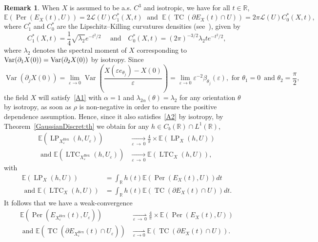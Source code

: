 \documentclass[10pt]{amsart}
\theoremstyle{definition}\newtheorem{defi}[theo]{Definition}\newtheorem{rema}[theo]{Remark}\newtheorem{exam}[theo]{Example}\newtheorem{exem}[theo]{Example}\newtheorem{nota}[theo]{Notation}
\newcommand{\R}{\mathbb{R}}
\newcommand{\E}{\mathbb{E}}
\newcommand{\eps}{\varepsilon}
\DeclareMathOperator{\TC}{TC}
\DeclareMathOperator{\LTC}{LTC}
\DeclareMathOperator{\LP}{LP}
\DeclareMathOperator{\Per}{Per}
\DeclareMathOperator{\Hex}{Hex}
\DeclareMathOperator{\Var}{Var}
\newcommand{\calL}{\mathcal{L}}
\begin{document}
\begin{rema}
When $X$ is assumed to be a.s. $C^3$ and isotropic, we have for all $t\in\R$,
\[
\E\left(\Per(E_X(t),U)\right) =2{\calL}(U)C_1^\ast(X,t)\;\text{ and }\;
\E\left(\TC(\partial E_X(t)\cap U)\right)= 2\pi {\calL}(U) C_0^\ast(X,t),
\]
where $C_1^\ast$ and $C_0^\ast$ are the Lipschitz--Killing curvatures densities (see~\cite{BDDE-19}), given by
\[
C_1^\ast(X,t)=\frac{1}{4}\sqrt{\lambda_2}e^{-t^2/2} \quad \text{ and
} \quad C_0^\ast(X,t)=(2\pi)^{-3/2}{\lambda_2}te^{-t^2/2},
\]
where $\lambda_2$ denotes the spectral moment of $X$ corresponding to $\Var(\partial_1 X(0))\linebreak=\Var(\partial_2 X(0))$ by isotropy. Since
\[
\Var\left(\partial_j X(0)\right)=\lim_{\eps\rightarrow 0}\Var\left(\frac{X(\eps e_{\theta_j})-X(0)}{\eps}\right)=\lim_{\eps\rightarrow 0}\eps^{-2}\beta_{\theta_j}(\eps),\text{ for }\theta_1=0
\,
\text{ and }\theta_2=\frac{\pi}{2},
\]
the field $X$ will satisfy~\eqref{A1} with $\alpha=1$ and $\lambda_{2\alpha}(\theta)=\lambda_2$ for any orientation $\theta$ by isotropy, as soon as $\rho$ is non-negative in order to ensure the positive dependence assumption. Hence, since it also satisfies~\eqref{A2} by isotropy, by Theorem~\ref{GaussianDiscret:th} we obtain for any $h\in C_b(\R)\cap L^1(\R)$,
\begin{align*}
\E\left(\LP_{X_\eps^{\Hex}}(h,U_\eps)\right)&\underset{\eps\,\to\,
0}{\longrightarrow}\frac{4}{\pi}\times \E(\LP_X(h,U)) \\
\text{ and }
\E\left(\LTC_{X_\eps^{\Hex}}(h,U_\eps)\right)&\underset{\eps\,\to\,0}{\longrightarrow} \E(\LTC_X(h,U)),
\end{align*}
with
\begin{align*} 
\E\left(\LP_X(h,U)\right) &=\int_\R h(t)\E\left(\Per(E_X(t),U)\right) dt
\\
\text{ and } \E\left(\LTC_X(h,U)\right) &=\int_\R h(t) \E\left(\TC(\partial E_X(t)\cap U)\right) dt.
\end{align*}
It follows that we have a weak-convergence
\begin{align*}
\E\left(\Per\left(E_{X_\eps^{\Hex}}(t),U_\eps\right)\right) &\underset{\eps\,\to\,0}{\rightharpoonup} \frac{4}{\pi}\times \E\left(\Per(E_X(t),U)\right)
\\
\text{ and }
\E\left(\TC\left(\partial E_{X_\eps^{\Hex}}(t)\cap U_\eps\right)\right) &\underset{\eps\to 0}{\rightharpoonup}
\E\left(\TC(\partial E_X(t) \cap U)\right).
\end{align*}
\end{rema}
\end{document}
